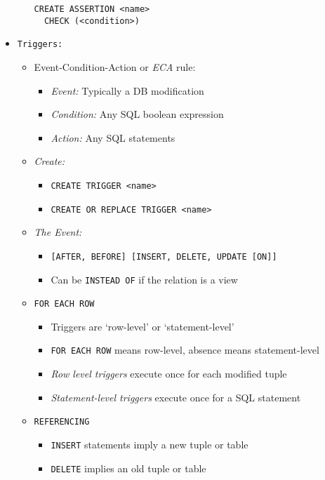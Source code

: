 \documentclass[landscape,8pt]{extarticle}
\newcommand{\code}{\lstinline}
\begin{document}
\begin{multicols}{4}
\begin{itemize}
\begin{itemize}
        \code{CREATE ASSERTION <name>} \\
        \code{  CHECK (<condition>)}
    \end{itemize}
    \item \code{Triggers:}
    \begin{itemize}
        \item Event-Condition-Action or \emph{ECA} rule:
        \begin{itemize}
            \item \emph{Event:} Typically a DB modification
            \item \emph{Condition:} Any SQL boolean expression
            \item \emph{Action:} Any SQL statements
        \end{itemize}
        \item \emph{Create:}
        \begin{itemize}
            \item \code{CREATE TRIGGER <name>}
            \item \code{CREATE OR REPLACE TRIGGER <name>}
        \end{itemize}
        \item \emph{The Event:}
        \begin{itemize}
            \item \code{[AFTER, BEFORE] [INSERT, DELETE, UPDATE [ON]]}
            \item Can be \code{INSTEAD OF} if the relation is a view
        \end{itemize}
        \item \code{FOR EACH ROW}
        \begin{itemize}
            \item Triggers are `row-level' or `statement-level'
            \item \code{FOR EACH ROW} means row-level, absence means statement-level
            \item \emph{Row level triggers} execute once for each modified tuple
            \item \emph{Statement-level triggers} execute once for a SQL statement
        \end{itemize}
        \item \code{REFERENCING}
        \begin{itemize}
            \item \code{INSERT} statements imply a new tuple or table
            \item \code{DELETE} implies an old tuple or table

\end{itemize}
\end{itemize}
\end{itemize}
\end{multicols}
\end{document}
